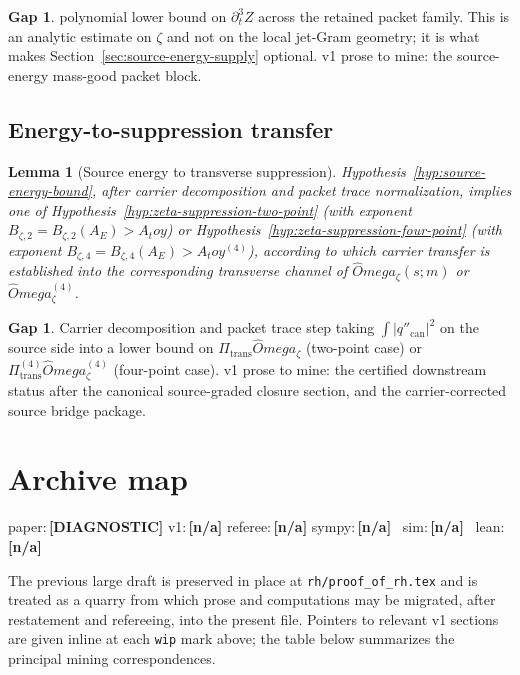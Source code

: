 \documentclass[11pt,a4paper]{amsart}
\def\Omega{Omega}%
\def\toy{toy}%
\numberwithin{equation}{section}
\theoremstyle{plain}
\newtheorem{lemma}[theorem]{Lemma}
\theoremstyle{definition}
\newcommand{\z}{\zeta}
\newcommand{\Om}{\Omega}
\newcommand{\toy}{\mathrm{toy}}
\newcommand{\can}{\mathrm{can}}
\newcommand{\trans}{\mathrm{trans}}
\newtheorem{wip}[theorem]{Gap}
\newcommand{\status}[1]{\textbf{\scriptsize[#1]}}
\newcommand{\statuspaper}[1]{\textsf{\footnotesize paper:}\,\status{#1}}
\newcommand{\statusmig}[1]{\textsf{\footnotesize v1:}\,\status{#1}}
\newcommand{\statusreferee}[1]{\textsf{\footnotesize referee:}\,\status{#1}}
\newcommand{\statussympy}[2][\relax]{%
  \textsf{\footnotesize sympy:}\,\status{#2}%
  \ifx\relax#1\else\,\textsf{\scriptsize\texttt{#1}}\fi%
}
\newcommand{\statussim}[2][\relax]{%
  \textsf{\footnotesize sim:}\,\status{#2}%
  \ifx\relax#1\else\,\textsf{\scriptsize\texttt{#1}}\fi%
}
\newcommand{\statuslean}[2][\relax]{%
  \textsf{\footnotesize lean:}\,\status{#2}%
  \ifx\relax#1\else\,\textsf{\scriptsize\texttt{#1}}\fi%
}
\begin{document}
\begin{wip}\label{rem:wip-source-energy-bound}
polynomial lower bound on \(\partial_t^3 Z\) across the
retained packet family.  This is an analytic estimate on \(\zeta\) and
not on the local jet-Gram geometry; it is what makes
Section~\ref{sec:source-energy-supply} optional.  v1 prose to
mine: the source-energy mass-good packet block.
\end{wip}

\subsection{Energy-to-suppression transfer}
\label{subsec:energy-to-suppression-transfer}

\begin{lemma}[Source energy to transverse suppression]
\label{lem:source-energy-to-suppression}
Hypothesis~\ref{hyp:source-energy-bound}, after carrier decomposition
and packet trace normalization, implies one of
Hypothesis~\ref{hyp:zeta-suppression-two-point} (with exponent
\(B_{\z,2}=B_{\z,2}(A_E)>A_\toy\)) or
Hypothesis~\ref{hyp:zeta-suppression-four-point} (with exponent
\(B_{\z,4}=B_{\z,4}(A_E)>A_\toy^{(4)}\)), according to which carrier
transfer is established into the corresponding transverse channel of
\(\widehat\Om_\z(s;m)\) or \(\widehat\Om_\z^{(4)}\).
\end{lemma}

\begin{wip}\label{rem:wip-source-energy-to-suppression}
Carrier decomposition and packet trace step taking
\(\int |q''_\can|^2\) on the source side into a lower bound on
\(\Pi_\trans\widehat\Om_\z\) (two-point case) or
\(\Pi_\trans^{(4)}\widehat\Om_\z^{(4)}\) (four-point case).  v1 prose
to mine: the certified downstream status after the canonical
source-graded closure section, and the carrier-corrected source
bridge package.
\end{wip}

\appendix

\section{Archive map}
\label{app:archive-map}
\statuspaper{DIAGNOSTIC}\quad
\statusmig{n/a}\quad
\statusreferee{n/a}\quad
\statussympy{n/a}\quad
\statussim{n/a}\quad
\statuslean{n/a}
\par\medskip

The previous large draft is preserved in place at
\texttt{rh/proof\_of\_rh.tex} and is treated as a quarry from which
prose and computations may be migrated, after restatement and
refereeing, into the present file.  Pointers to relevant v1 sections
are given inline at each \texttt{wip} mark above; the table below
summarizes the principal mining correspondences.
\end{document}
